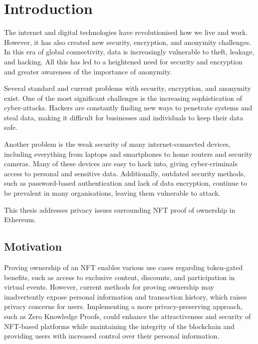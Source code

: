 \chapter{Introduction}
The internet and digital technologies have revolutionised how we live and work. However, it has also created new security, encryption, and anonymity challenges. In this era of global connectivity, data is increasingly vulnerable to theft, leakage, and hacking. All this has led to a heightened need for security and encryption and greater awareness of the importance of anonymity.

Several standard and current problems with security, encryption, and anonymity exist. One of the most significant challenges is the increasing sophistication of cyber-attacks. Hackers are constantly finding new ways to penetrate systems and steal data, making it difficult for businesses and individuals to keep their data safe.

Another problem is the weak security of many internet-connected devices, including everything from laptops and smartphones to home routers and security cameras. Many of these devices are easy to hack into, giving cyber-criminals access to personal and sensitive data. Additionally, outdated security methods, such as password-based authentication and lack of data encryption, continue to be prevalent in many organisations, leaving them vulnerable to attack.

This thesis addresses privacy issues surrounding NFT proof of ownership in Ethereum.

\section{Motivation}
Proving ownership of an NFT enables various use cases regarding token-gated benefits, such as access to exclusive content, discounts, and participation in virtual events. However, current methods for proving ownership may inadvertently expose personal information and transaction history, which raises privacy concerns for users. Implementing a more privacy-preserving approach, such as Zero Knowledge Proofs, could enhance the attractiveness and security of NFT-based platforms while maintaining the integrity of the blockchain and providing users with increased control over their personal information.

